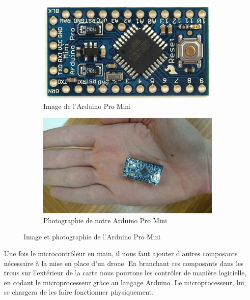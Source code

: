 \documentclass[a4paper,10pt]{report}
\begin{document}
	\begin{figure}
	  \begin{subfigure}{.5\textwidth}
	    \centering
	    \includegraphics[scale=0.2]{img/arduinopromini.jpg}
	    \caption{Image de l'Arduino Pro Mini}
	    \label{imagearduino}
	  \end{subfigure}%
	  \begin{subfigure}{.5\textwidth}
	    \centering
	    \includegraphics[scale=0.06]{img/arduino.JPG}
	    \caption{Photographie de notre Arduino Pro Mini}
	    \label{photoarduino}
	  \end{subfigure}
	  \caption{Image et photographie de l'Arduino Pro Mini}
	  \label{arduino}
	\end{figure}
	
      Une fois le microcontrôleur en main, il nous faut ajouter d'autres 
composants nécessaire à la mise en place d'un drone. En branchant ces 
composants dans les trous sur l'extérieur de la carte nous pourrons les 
contrôler de manière logicielle, en codant le microprocesseur grâce au langage 
Arduino. Le microprocesseur, lui, se chargera de les faire fonctionner 
physiquement.  
	
\end{document}
